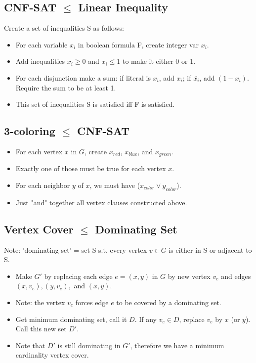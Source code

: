\documentclass[12pt]{article}
\providecommand{\reducible}[2]{
  \textbf{#1} $\leq$ \textbf{#2}
}
\begin{document}
\subsection{\reducible{CNF-SAT}{Linear Inequality}}
Create a set of inequalities S as follows:\\
\begin{itemize}
  \item For each variable $x_i$ in boolean formula F, create integer var $x_i$.
  \item Add inequalities $x_i \geq 0$ and $x_i \leq 1$ to make it either 0 or 1.
  \item For each disjunction make a sum: if literal is $x_i$, add $x_i$; if $\overline{x_i}$, add $(1-x_i)$. Require the sum to be at least 1.
  \item This set of inequalities S is satisfied iff F is satisfied.
\end{itemize}

\subsection{\reducible{3-coloring}{CNF-SAT}}
\begin{itemize}
  \item For each vertex $x$ in $G$, create $x_{red}$, $x_{blue}$, and $x_{green}$.
  \item Exactly one of those must be true for each vertex $x$.
  \item For each neighbor $y$ of $x$, we must have ($x_{color} \lor y_{color}$).
  \item Just "and" together all vertex clauses constructed above.
\end{itemize}

\subsection{\reducible{Vertex Cover}{Dominating Set}}
Note: 'dominating set' = set S s.t. every vertex $v \in G$ is either in S or adjacent to S.
\begin{itemize}
  \item Make $G'$ by replacing each edge $e = (x,y)$ in $G$ by new vertex $v_e$ and edges $(x,v_e),(y,v_e),$ and $(x,y)$.
  \item Note: the vertex $v_e$ forces edge $e$ to be covered by a dominating set.
  \item Get minimum dominating set, call it $D$. If any $v_e \in D$, replace $v_e$ by $x$ (or $y$). Call this new set $D'$.
  \item Note that $D'$ is still dominating in $G'$, therefore we have a minimum cardinality vertex cover.
\end{itemize}
\end{document}
